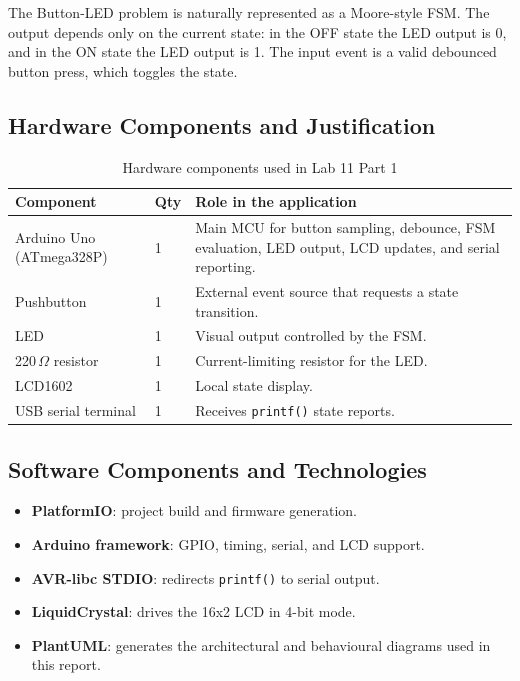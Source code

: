 \documentclass[12pt]{article}
\begin{document}
\hspace{0.8cm} The Button-LED problem is naturally represented as a Moore-style FSM. The output depends only on the current state: in the OFF state the LED output is 0, and in the ON state the LED output is 1. The input event is a valid debounced button press, which toggles the state.

\subsection{Hardware Components and Justification}

\begin{table}[H]
\centering
\begin{tabular}{p{4.2cm} p{1.3cm} p{7.4cm}}
\toprule
\textbf{Component} & \textbf{Qty} & \textbf{Role in the application} \\
\midrule
Arduino Uno (ATmega328P) & 1 & Main MCU for button sampling, debounce, FSM evaluation, LED output, LCD updates, and serial reporting. \\
Pushbutton & 1 & External event source that requests a state transition. \\
LED & 1 & Visual output controlled by the FSM. \\
220\,$\Omega$ resistor & 1 & Current-limiting resistor for the LED. \\
LCD1602 & 1 & Local state display. \\
USB serial terminal & 1 & Receives \texttt{printf()} state reports. \\
\bottomrule
\end{tabular}
\caption{Hardware components used in Lab 11 Part 1}
\label{tab:hardware}
\end{table}

\subsection{Software Components and Technologies}
\begin{itemize}
    \item \textbf{PlatformIO}: project build and firmware generation.
    \item \textbf{Arduino framework}: GPIO, timing, serial, and LCD support.
    \item \textbf{AVR-libc STDIO}: redirects \texttt{printf()} to serial output.
    \item \textbf{LiquidCrystal}: drives the 16x2 LCD in 4-bit mode.
    \item \textbf{PlantUML}: generates the architectural and behavioural diagrams used in this report.
\end{itemize}
\end{document}
